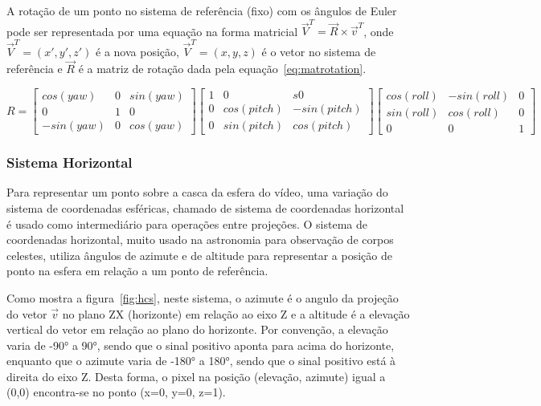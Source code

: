 {A rotação de um ponto no sistema de referência (fixo) com os ângulos de Euler pode ser representada por uma equação na forma matricial $\overrightarrow{V}^T = \overrightarrow{R} \times \overrightarrow{v}^T $, onde $\overrightarrow{V}^T = (x',y',z')$ é a nova posição, $\overrightarrow{V}^T = (x,y,z)$ é o vetor no sistema de referência e $\overrightarrow{R}$ é a matriz de rotação dada pela equação~\ref{eq:matrotation}.

\begin{equation}
	R=\begin{bmatrix}
		cos(yaw) & 0 & sin(yaw)\\
		0 & 1 & 0\\
		-sin(yaw) & 0 & cos(yaw)
	\end{bmatrix}
	\begin{bmatrix}
		1 & 0 & s0\\
		0 & cos(pitch) & -sin(pitch)\\
		0 & sin(pitch) & cos(pitch)
	\end{bmatrix}
	\begin{bmatrix}
		cos(roll) & -sin(roll) & 0\\
		sin(roll) & cos(roll) & 0\\
		0 & 0 & 1
	\end{bmatrix}
	\label{eq:matrotation}
\end{equation}	
	
\subsubsection{Sistema Horizontal}

Para representar um ponto sobre a casca da esfera do vídeo, uma variação do sistema de coordenadas esféricas, chamado de sistema de coordenadas horizontal é usado como intermediário para operações entre projeções. O sistema de coordenadas horizontal, muito usado na astronomia para observação de corpos celestes, utiliza ângulos de azimute e de altitude para representar a posição de ponto na esfera em relação a um ponto de referência.

Como mostra a figura~\ref{fig:hcs}, neste sistema, o azimute é o angulo da projeção do vetor $ \overrightarrow{v}$ no plano ZX (horizonte) em relação ao eixo Z e a altitude é a elevação vertical do vetor em relação ao plano do horizonte. Por convenção, a elevação varia de -90° a 90°, sendo que o sinal positivo aponta para acima do horizonte, enquanto que o azimute varia de -180° a 180°, sendo que o sinal positivo está à direita do eixo Z. Desta forma, o pixel na posição (elevação, azimute) igual a (0,0) encontra-se no ponto (x=0, y=0, z=1). 

}
